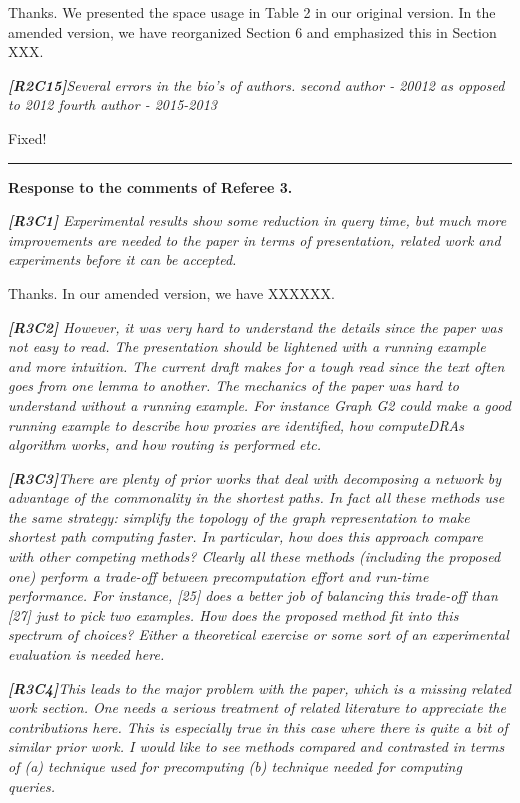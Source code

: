 \documentclass[11pt]{letter}
\newcommand{\vs}{\vspace{1ex}}
\newcommand{\svs}{\vspace{0.36ex}}
\begin{document}
\svs
Thanks. We presented the space usage in Table 2 in our original version. In the amended version, we have reorganized Section 6 and emphasized this in Section XXX.

\vs
\noindent
{\em{\bf[R2C15]}Several errors in the bio's of authors.
second author - 20012 as opposed to 2012
fourth author - 2015-2013}

\svs
Fixed!










\vspace{2.8ex}
\hrule
\vspace{0.6ex}
{\bf Response to the comments of Referee 3.}


\vs
\noindent
{\em{\bf[R3C1]}
Experimental results show some reduction in query time, but much more improvements are needed to the paper in terms of presentation, related work and experiments before it can be accepted.}
\svs

Thanks. In our amended version, we have XXXXXX.



\vs
\noindent
{\em{\bf[R3C2]}  However, it was very hard to understand the details since the paper was not easy to read. The presentation should be lightened with a running example and more intuition.  The current draft makes for a tough read since the text often goes from one lemma to another. The mechanics of the paper was hard to understand without a running example.  For instance Graph G2 could make a good running example to describe how proxies are identified, how computeDRAs algorithm works, and how routing is performed etc.}
\svs

\vs
\noindent
{\em{\bf[R3C3]}There are plenty of prior works that deal with decomposing a network by advantage of the commonality in the shortest paths. In fact all these methods use the same strategy: simplify the topology of the graph representation to make shortest path computing faster. In particular, how does this approach compare with other competing methods? Clearly all these methods (including the proposed one) perform a trade-off between precomputation effort and run-time performance. For instance, [25] does a better job of balancing this trade-off than [27] just to pick two examples. How does the proposed method fit into this spectrum of choices? Either a theoretical exercise or some sort of an experimental evaluation is needed here.}
\svs

\vs
\noindent
{\em{\bf[R3C4]}This leads to the major problem with the paper, which is a missing related work section.  One needs a serious treatment of related literature to appreciate the contributions here. This is especially true in this case where there is quite a bit of similar prior work. I would like to see methods compared and contrasted in terms of (a) technique used for precomputing (b) technique needed for computing queries.}
\svs
\end{document}
